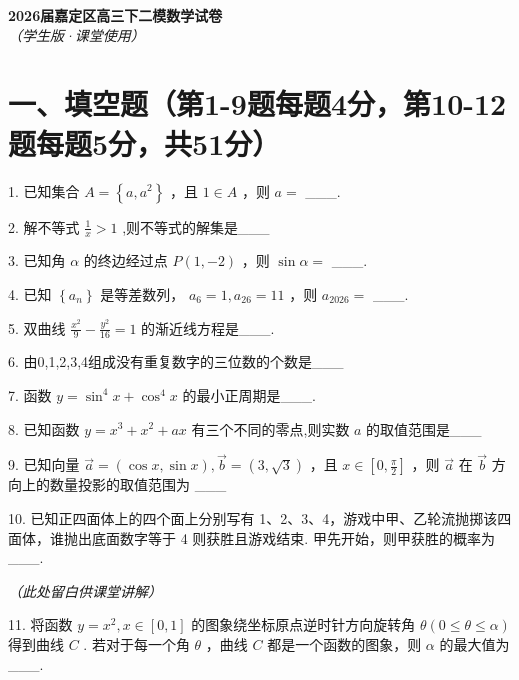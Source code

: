 \documentclass[10pt]{article}
\newcommand{\boardspace}[1]{%
  \par\vspace{#1}
}
\newcommand{\hardboardspace}{%
  \par\vspace{5cm}
  \hfill\textit{（此处留白供课堂讲解）}
  \par\vspace{1cm}
}
\begin{document}
\begin{center}
\Large\textbf{2026届嘉定区高三下二模数学试卷}\\[0.5em]
\normalsize\textit{（学生版·课堂使用）}
\end{center}

\section*{一、填空题（第1-9题每题4分，第10-12题每题5分，共51分）}

1. 已知集合 \(A = \left\{  {a,{a}^{2}}\right\}\) ，且 \(1 \in  A\) ，则 \(a =\) ___.

\boardspace{1.5cm}

2. 解不等式 \(\frac{1}{x} > 1\) ,则不等式的解集是___

\boardspace{1.5cm}

3. 已知角 \(\alpha\) 的终边经过点 \(P\left( {1, - 2}\right)\) ，则 \(\sin \alpha  =\) ___.

\boardspace{1.5cm}

4. 已知 \(\left\{  {a}_{n}\right\}\) 是等差数列， \({a}_{6} = 1,{a}_{26} = {11}\) ，则 \({a}_{2026} =\) ___.

\boardspace{1.5cm}

5. 双曲线 \(\frac{{x}^{2}}{9} - \frac{{y}^{2}}{16} = 1\) 的渐近线方程是___.

\boardspace{1.5cm}

6. 由0,1,2,3,4组成没有重复数字的三位数的个数是___

\boardspace{1.5cm}

7. 函数 \(y = {\sin }^{4}x + {\cos }^{4}x\) 的最小正周期是___.

\boardspace{1.5cm}

8. 已知函数 \(y = {x}^{3} + {x}^{2} + {ax}\) 有三个不同的零点,则实数 \(a\) 的取值范围是___

\boardspace{1.5cm}

9. 已知向量 \(\overrightarrow{a} = \left( {\cos x,\sin x}\right) ,\overrightarrow{b} = \left( {3,\sqrt{3}}\right)\) ，且 \(x \in  \left\lbrack  {0,\frac{\pi }{2}}\right\rbrack\) ，则 \(\overrightarrow{a}\) 在 \(\overrightarrow{b}\) 方向上的数量投影的取值范围为 ___

\boardspace{1.5cm}

10. 已知正四面体上的四个面上分别写有 1、2、3、4，游戏中甲、乙轮流抛掷该四面体，谁抛出底面数字等于 4 则获胜且游戏结束. 甲先开始，则甲获胜的概率为___.

\hardboardspace

11. 将函数 \(y = {x}^{2}, x \in  \left\lbrack  {0,1}\right\rbrack\) 的图象绕坐标原点逆时针方向旋转角 \(\theta \left( {0 \leq  \theta  \leq  \alpha }\right)\) 得到曲线 \(C\) . 若对于每一个角 \(\theta\) ，曲线 \(C\) 都是一个函数的图象，则 \(\alpha\) 的最大值为___.
\end{document}
